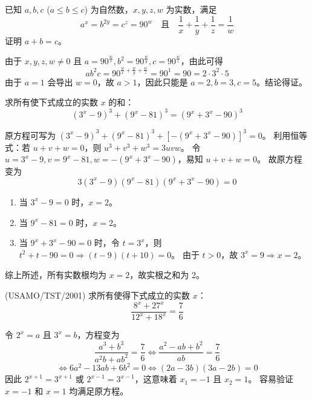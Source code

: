 \begin{questions}
\question
已知 $a, b, c$ ($a \le b \le c$) 为自然数，$x, y, z, w$ 为实数，满足
\[
a^x = b^{2y} = c^z = 90^w \quad \text{且} \quad \frac{1}{x} + \frac{1}{y} + \frac{1}{z} = \frac{1}{w}
\]
证明 $a + b = c$。
\begin{solution}
由于 $x, y, z, w \ne 0$ 且 $a = 90^{\frac{w}{x}}, b^2 = 90^{\frac{w}{y}}, c = 90^{\frac{w}{z}}$，由此可得
\[
ab^2c = 90^{\frac{w}{x} + \frac{w}{y} + \frac{w}{z}} = 90^1 = 90 = 2 \cdot 3^2 \cdot 5
\]
由于 $a = 1$ 会导出 $w = 0$，故 $a > 1$，因此只能是 $a = 2, b = 3, c = 5$。结论得证。
\end{solution}

\question
求所有使下式成立的实数 $x$ 的和：
\[
\left(3^x - 9\right)^3 + \left(9^x - 81\right)^3 = \left(9^x + 3^x - 90\right)^3
\]
\begin{solution}
原方程可写为 $\left(3^x - 9\right)^3 + \left(9^x - 81\right)^3 + \left[-(9^x + 3^x - 90)\right]^3 = 0$。
利用恒等式：若 $u+v+w=0$，则 $u^3+v^3+w^3=3uvw$。
令 $u = 3^x - 9, v = 9^x - 81, w = -(9^x + 3^x - 90)$，易知 $u+v+w=0$。
故原方程变为
\[
3\left(3^x - 9\right)\left(9^x - 81\right)\left(9^x + 3^x - 90\right) = 0
\]
\begin{enumerate}
    \item 当 $3^x - 9 = 0$ 时，$x = 2$。
    \item 当 $9^x - 81 = 0$ 时，$x = 2$。
    \item 当 $9^x + 3^x - 90 = 0$ 时，令 $t = 3^x$，则 $t^2 + t - 90 = 0 \Rightarrow (t-9)(t+10) = 0$。
    由于 $t > 0$，故 $3^x = 9 \Rightarrow x = 2$。
\end{enumerate}
综上所述，所有实数根均为 $x = 2$，故实根之和为 2。
\end{solution}

\question (USAMO/TST/2001) 求所有使得下式成立的实数 $x$：
\[
\frac{8^x + 27^x}{12^x + 18^x} = \frac{7}{6}
\]
\begin{solution}
令 $2^x = a$ 且 $3^x = b$，方程变为
\[
\frac{a^3 + b^3}{a^2b + ab^2} = \frac{7}{6} \Leftrightarrow \frac{a^2 - ab + b^2}{ab} = \frac{7}{6}
\]
\[
\Leftrightarrow 6a^2 - 13ab + 6b^2 = 0 \Leftrightarrow (2a - 3b)(3a - 2b) = 0
\]
因此 $2^{x+1} = 3^{x+1}$ 或 $2^{x-1} = 3^{x-1}$，这意味着 $x_1 = -1$ 且 $x_2 = 1$。
容易验证 $x = -1$ 和 $x = 1$ 均满足原方程。
\end{solution}


\end{questions}
